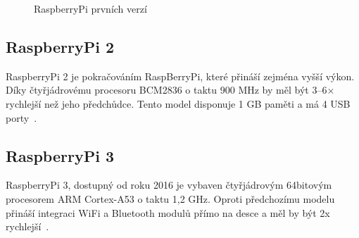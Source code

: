 \begin{figure}[!ht]
    \centering
			\hspace*{5mm}
			\hspace*{5mm}
		\caption{RaspberryPi prvních verzí}
		\vspace{-20pt}	
\end{figure}
	
	\subsection{RaspberryPi 2}
	RaspberryPi 2 je pokračováním RaspBerryPi, které přináší zejména vyšší výkon. Díky čtyřjádrovému procesoru BCM2836 o taktu 900 MHz by měl být 3–6× rychlejší než jeho předchůdce. Tento model disponuje 1 GB paměti a má 4 USB porty~\cite{RaspiTwo}.


\subsection{RaspberryPi 3}
		RaspberryPi 3, dostupný od roku 2016 je vybaven čtyřjádrovým 64bitovým procesorem ARM Cortex-A53 o taktu 1,2 GHz. Oproti předchozímu modelu přináší integraci WiFi a Bluetooth modulů přímo na desce a měl by být 2x rychlejší~\cite{RaspiThree}.
		
